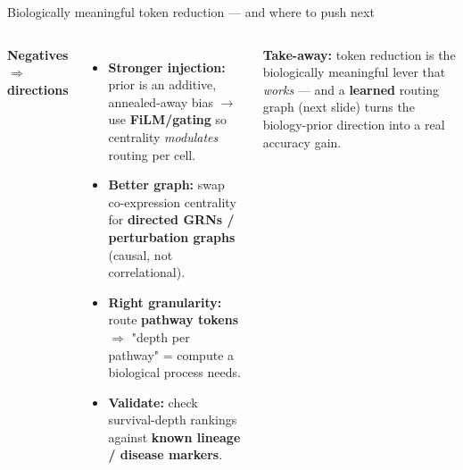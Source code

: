 \documentclass[aspectratio=169,11pt]{beamer}
\newcommand{\good}[1]{\textcolor{accentA}{\textbf{#1}}}
\begin{document}
\begin{frame}{Biologically meaningful token reduction --- and where to push next}
\begin{columns}[T]
\textbf{\footnotesize Negatives $\Rightarrow$ directions}
\begin{itemize}\footnotesize
  \item \good{Stronger injection:} prior is an additive, annealed-away bias $\to$ use \good{FiLM/gating} so centrality \emph{modulates} routing per cell.
  \item \good{Better graph:} swap co-expression centrality for \good{directed GRNs / perturbation graphs} (causal, not correlational).
  \item \good{Right granularity:} route \good{pathway tokens} $\Rightarrow$ "depth per pathway" = compute a biological process needs.
  \item \good{Validate:} check survival-depth rankings against \good{known lineage / disease markers}.
\end{itemize}
\vspace{1mm}
{\footnotesize\good{Take-away:} token reduction is the biologically meaningful lever that \emph{works} --- and a \good{learned} routing graph (next slide) turns the biology-prior direction into a real accuracy gain.}
\end{columns}
\end{frame}
\end{document}

